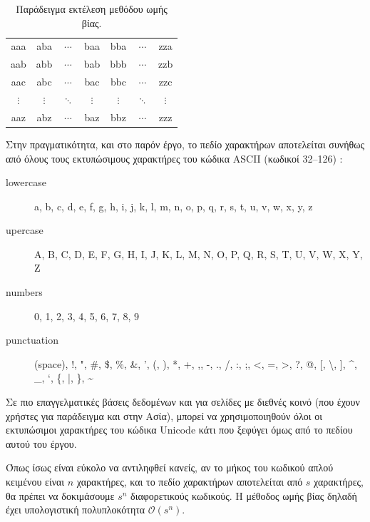 \documentclass[11pt]{article}
\newcommand*{\mytextvisiblespace}{\fontfamily{DejaVu}\selectfont\textvisiblespace}
\newenvironment{alltt}{\ttfamily}{\rmfamily}
\begin{document}
\begin{table}[h]
    \centering
    \begin{alltt}
        \begin{tabular}{ccccccc}
            aaa & aba & $\cdots$ & baa & bba & $\cdots$ & zza \\
            aab & abb & $\cdots$ & bab & bbb & $\cdots$ & zzb \\
            aac & abc & $\cdots$ & bac & bbc & $\cdots$ & zzc \\
            $\vdots$ & $\vdots$ & $\ddots$ & $\vdots$ & $\vdots$ & $\ddots$ & $\vdots$ \\
            aaz & abz & $\cdots$ & baz & bbz & $\cdots$ & zzz \\
        \end{tabular}
    \end{alltt}
    \caption{Παράδειγμα εκτέλεση μεθόδου ωμής βίας.\label{tab:bruteforce}}
\end{table}

Στην πραγματικότητα, και στο παρόν έργο, το πεδίο χαρακτήρων αποτελείται συνήθως από όλους τους εκτυπώσιμους χαρακτήρες του κώδικα ASCII (κωδικοί 32--126) \cite{wiki:graphic_character_ascii}:
\begin{alltt}
    \begin{description}
        \item[lowercase] a, b, c, d, e, f, g, h, i, j, k, l, m, n, o, p, q, r, s, t, u, v, w, x, y, z
        \item[upercase] A, B, C, D, E, F, G, H, I, J, K, L, M, N, O, P, Q, R, S, T, U, V, W, X, Y, Z
        \item[numbers] 0, 1, 2, 3, 4, 5, 6, 7, 8, 9
        \item[punctuation] \mytextvisiblespace (space), !, ", \#, \$, \%, \&, ', (, ), *, +, ,, -, ., /, :, ;, <, =, >, ?, @, [, \textbackslash, ], \textasciicircum, \_, `, \{, |, \}, \textasciitilde
    \end{description}
\end{alltt}

Σε πιο επαγγελματικές βάσεις δεδομένων και για σελίδες με διεθνές κοινό (που έχουν χρήστες για παράδειγμα και στην Ασία), μπορεί να χρησιμοποιηθούν όλοι οι εκτυπώσιμοι χαρακτήρες του κώδικα Unicode \cite{wiki:graphic_character_unicode} κάτι που ξεφύγει όμως από το πεδίου αυτού του έργου.

Όπως ίσως είναι εύκολο να αντιληφθεί κανείς, αν το μήκος του κωδικού απλού κειμένου είναι $n$ χαρακτήρες, και το πεδίο χαρακτήρων αποτελείται από $s$ χαρακτήρες, θα πρέπει να δοκιμάσουμε $s^n$ διαφορετικούς κωδικούς. Η μέθοδος ωμής βίας δηλαδή έχει υπολογιστική πολυπλοκότητα $\mathcal{O}(s^n)$.
\end{document}
